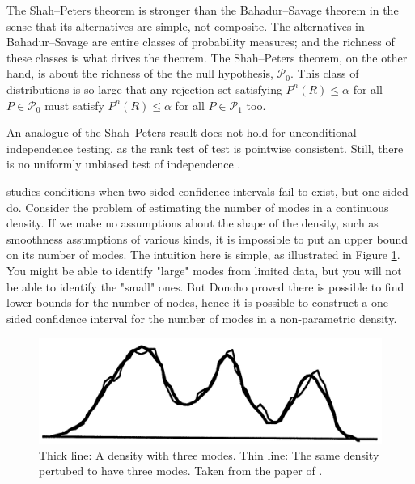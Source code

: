 The Shah--Peters theorem is stronger than the Bahadur--Savage theorem in the sense that its alternatives are simple, not composite. The alternatives in Bahadur--Savage are entire classes of probability measures; and the richness of these classes is what drives the theorem. The Shah--Peters theorem, on the other hand, is about the richness of the the null hypothesis, $\mathcal{P}_{0}$. This class of distributions is so large that any rejection set satisfying $P^{n}(R)\leq\alpha$ for all $P\in\mathcal{P}_{0}$ must satisfy $P^{n}(R)\leq\alpha$ for all $P\in\mathcal{P}_{1}$ too.

An analogue of the Shah--Peters result does not hold for unconditional independence testing, as the rank test of \textcite{Hoeffding1948-nm} test is pointwise consistent. Still, there is no uniformly unbiased test of independence \parencite{Moss2020-bc}.

\textcite{Donoho1988-hg} studies conditions when two-sided confidence intervals fail to exist, but one-sided do. Consider the problem of estimating the number of modes in a continuous density. If we make no assumptions about the shape of the density, such as smoothness assumptions of various kinds, it is impossible to put an upper bound on its number of modes. The intuition here is simple, as illustrated in Figure \ref{fig:donoho}. You might be able to identify "large" modes from limited data, but you will not be able to identify the "small" ones. But Donoho proved there is possible to find lower bounds for the number of nodes, hence it is possible to construct a one-sided confidence interval for the number of modes in a non-parametric density.

\begin{figure}
    \centering
    \includegraphics[scale=0.16]{figures/donoho.png}
    \caption{Thick line: A density with three modes. Thin line: The same density pertubed to have three modes. Taken from the paper of \textcite{Donoho1988-hg}.}
    \label{fig:donoho}
\end{figure}

